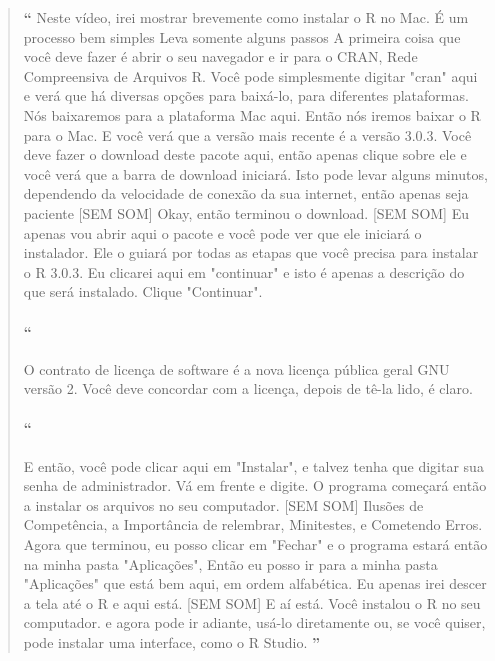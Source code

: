 \begin{quotation}%
\begin{small}
{\large\textbf{``}}%
Neste vídeo, irei mostrar brevemente como instalar o R no Mac. É um processo bem simples Leva somente alguns passos A primeira coisa que você deve fazer é abrir o seu navegador e ir para o CRAN, Rede Compreensiva de Arquivos R. Você pode simplesmente digitar "cran" aqui e verá que há diversas opções para baixá-lo, para diferentes plataformas. Nós baixaremos para a plataforma Mac aqui. Então nós iremos baixar o R para o Mac. E você verá que a versão mais recente é a versão 3.0.3. Você deve fazer o download deste pacote aqui, então apenas clique sobre ele e você verá que a barra de download iniciará. Isto pode levar alguns minutos, dependendo da velocidade de conexão da sua internet, então apenas seja paciente [SEM SOM] Okay, então terminou o download. [SEM SOM] Eu apenas vou abrir aqui o pacote e você pode ver que ele iniciará o instalador. Ele o guiará por todas as etapas que você precisa para instalar o R 3.0.3. Eu clicarei aqui em "continuar" e isto é apenas a descrição do que será instalado. Clique "Continuar".

\paragraph{``}
O contrato de licença de software é a nova licença pública geral GNU versão 2. Você deve concordar com a licença, depois de tê-la lido, é claro. 

\paragraph{``}
E então, você pode clicar aqui em "Instalar", e talvez tenha que digitar sua senha de administrador. Vá em frente e digite. O programa começará então a instalar os arquivos no seu computador. [SEM SOM] Ilusões de Competência, a Importância de relembrar, Minitestes, e Cometendo Erros. Agora que terminou, eu posso clicar em "Fechar" e o programa estará então na minha pasta "Aplicações", Então eu posso ir para a minha pasta "Aplicações" que está bem aqui, em ordem alfabética. Eu apenas irei descer a tela até o R e aqui está. [SEM SOM] E aí está. Você instalou o R no seu computador. e agora pode ir adiante, usá-lo diretamente ou, se você quiser, pode instalar uma interface, como o R Studio.
{\large\textbf{''}}
\end{small}
\end{quotation}


